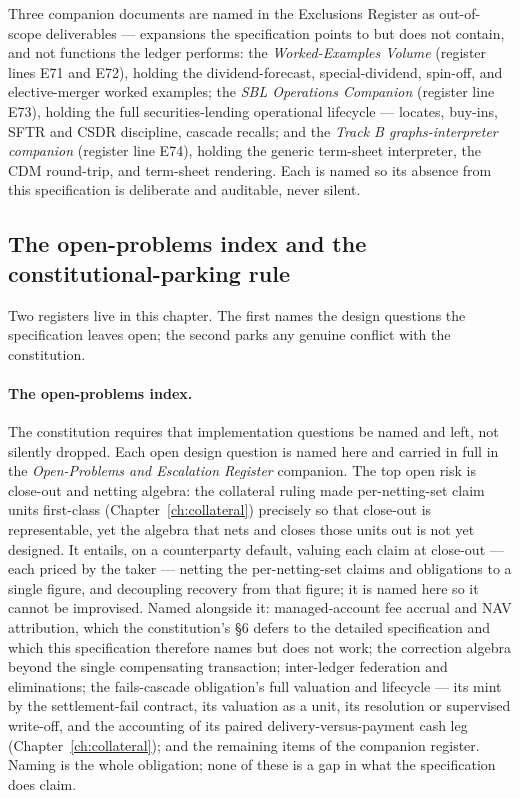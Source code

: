 Three companion documents are named in the Exclusions Register as out-of-scope
deliverables --- expansions the specification points to but does not contain, and not
functions the ledger performs: the \emph{Worked-Examples Volume} (register lines E71 and
E72), holding the dividend-forecast, special-dividend, spin-off, and elective-merger
worked examples; the \emph{SBL Operations Companion} (register line E73), holding the full
securities-lending operational lifecycle --- locates, buy-ins, SFTR and CSDR discipline,
cascade recalls; and the \emph{Track B graphs-interpreter companion} (register line E74),
holding the generic term-sheet interpreter, the CDM round-trip, and term-sheet rendering.
Each is named so its absence from this specification is deliberate and auditable, never
silent.

\subsection{The open-problems index and the constitutional-parking rule}

Two registers live in this chapter. The first names the design questions the specification
leaves open; the second parks any genuine conflict with the constitution.

\paragraph{The open-problems index.} The constitution requires that implementation
questions be named and left, not silently dropped. Each open design question is named here
and carried in full in the \emph{Open-Problems and Escalation Register} companion. The
top open risk is close-out and netting algebra: the collateral ruling made
per-netting-set claim units first-class (Chapter~\ref{ch:collateral}) precisely so that
close-out is representable, yet the algebra that nets and closes those units out is not yet
designed. It entails, on a counterparty default, valuing each claim at close-out --- each
priced by the taker --- netting the per-netting-set claims and obligations to a single
figure, and decoupling recovery from that figure; it is named here so it cannot be
improvised. Named alongside it: managed-account fee accrual and NAV attribution, which the
constitution's \S6 defers to the detailed specification and which this specification
therefore names but does not work; the correction
algebra beyond the single compensating transaction; inter-ledger federation and
eliminations; the fails-cascade obligation's full valuation and lifecycle --- its mint by
the settlement-fail contract, its valuation as a unit, its resolution or supervised
write-off, and the accounting of its paired delivery-versus-payment cash leg
(Chapter~\ref{ch:collateral}); and the remaining items of the companion register. Naming is the whole
obligation; none of these is a gap in what the specification does claim.

